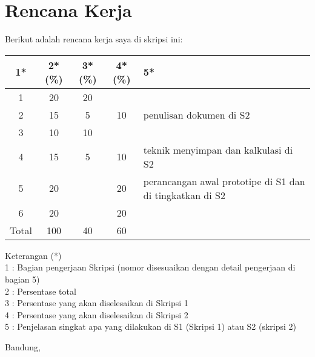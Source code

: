 \documentclass[a4paper,twoside]{article}
\begin{document}
\section{Rencana Kerja}

Berikut adalah rencana kerja saya di skripsi ini:

\begin{center}
  \begin{tabular}{ | c | c | c | c | l |}
    \hline
    1*  & 2*(\%) & 3*(\%) & 4*(\%) &5*\\ \hline \hline
    1   & 20  & 20  &  &  \\ \hline
    2   & 15 & 5  & 10  & {\footnotesize penulisan dokumen di S2} \\ \hline
    3   & 10  & 10  &  &   \\ \hline
    4   & 15  & 5  &  10 & {\footnotesize teknik menyimpan dan kalkulasi di S2} \\ \hline
    5   & 20 &   & 20 & {\footnotesize perancangan awal prototipe di S1 dan di tingkatkan di S2} \\ \hline
    6   & 20 &  & 20  & \\ \hline
    Total  & 100  & 40  & 60 &  \\ \hline
                          \end{tabular}
\end{center}

Keterangan (*)\\
1 : Bagian pengerjaan Skripsi (nomor disesuaikan dengan detail pengerjaan di bagian 5)\\
2 : Persentase total \\
3 : Persentase yang akan diselesaikan di Skripsi 1 \\
4 : Persentase yang akan diselesaikan di Skripsi 2 \\
5 : Penjelasan singkat apa yang dilakukan di S1 (Skripsi 1) atau S2 (skripsi 2)

\vspace{1cm}
\centering Bandung, \tanggal\\
\vspace{2cm} \nama \\ 
\vspace{1cm}
\end{document}
